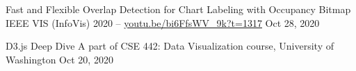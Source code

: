 \begin{cvpubs}
  \cvpub
    {Fast and Flexible Overlap Detection for Chart Labeling with Occupancy Bitmap} %
    {IEEE VIS (InfoVis) 2020  --  \href{https://youtu.be/bi6FfsWV_9k?t=1317}{\underline{youtu.be/bi6FfsWV\_9k?t=1317}}} %
    {Oct 28, 2020} %
    {} %

  \cvpub
    {D3.js Deep Dive} %
    {A part of CSE 442: Data Visualization course, University of Washington} %
    {Oct 20, 2020} %
    {} %
\end{cvpubs}
